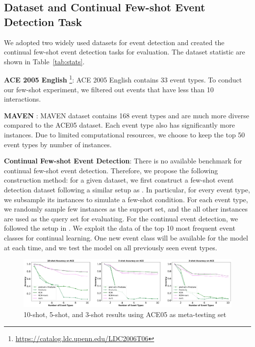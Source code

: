 



  
\subsection{Dataset and Continual Few-shot Event Detection Task}
We adopted two widely used datasets for event detection and created the continual few-shot event detection tasks for evaluation. The dataset statistic are shown in Table~\ref{tab:stats}.

\noindent
\textbf{ACE 2005 English} \footnote{\url{https://catalog.ldc.upenn.edu/LDC2006T06}}: ACE 2005 English contains 33 event types.  To conduct our few-shot experiment, we filtered out events that have less than 10 interactions.

\noindent
\textbf{MAVEN} \citep{wang2020MAVEN}: MAVEN dataset contains 168 event types and are much more diverse compared to the ACE05 dataset. Each event type also has significantly more instances.  Due to limited computational resources, we choose to keep the top 50 event types by number of instances.  

\noindent
\textbf{Continual Few-shot Event Detection}: There is no available benchmark for continual few-shot event detection. Therefore, we propose the following construction method: for a given dataset,  we first construct a few-shot event detection dataset following a similar setup as \citep{chen2021honey}.  In particular,  for every event type,  we subsample its instances to simulate a few-shot condition.  For each event type, we randomly sample few instances as the support set, and the all other instances are used as the query set for evaluating.  For the continual event detection,  we followed the setup in \citep{cao2020incremental}.  We exploit the data of the top 10 most frequent event classes for continual learning. One new event class will be available for the model at each time, and we test the model on all previously seen event types. 

\begin{figure}[ht]
\centering
    \includegraphics[scale=0.28]{imgs/MAVEN_ACE.jpg}
    \caption{10-shot, 5-shot, and 3-shot results using ACE05 as meta-testing set}
    \label{img:result_ACE}
\end{figure}
